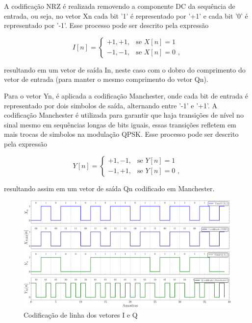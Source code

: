 A codificação \gls{NRZ} é realizada removendo a componente DC da sequência de entrada, ou seja, no vetor \gls{Xn} cada bit '1' é representado por '+1' e cada bit '0' é representado por '-1'. Esse processo pode ser descrito pela expressão

\begin{equation}
I[n] = 
\begin{cases}
+1, +1, & \text{se } X[n] = 1 \\
-1, -1, & \text{se } X[n] = 0 \text{ ,}
\end{cases}
\end{equation}

\noindent resultando em um vetor de saída \gls{In}, neste caso com o dobro do comprimento do vetor de entrada (para manter o mesmo comprimento do vetor \gls{Qn}). 

Para o vetor \gls{Yn}, é aplicada a codificação \gls{Manchester}, onde cada bit de entrada é representado por dois simbolos de saída, alternando entre '-1' e '+1'.  A codificação \gls{Manchester} é utilizada para garantir que haja transições de nível no sinal mesmo em sequências longas de bits iguais, essas transições refletem em mais trocas de simbolos na modulação \gls{QPSK}. Esse processo pode ser descrito pela expressão

\begin{equation}
Y[n] = 
\begin{cases}
+1,-1, & \text{se } Y[n] = 1 \\
-1,+1, & \text{se } Y[n] = 0 \text{ ,}
\end{cases}
\end{equation}

\noindent resultando assim em um vetor de saída \gls{Qn} codificado em Manchester.
\begin{figure}[H]
	\centering
	\caption{Codificação de linha dos vetores I e Q}\label{fig:line_coding}
	\includegraphics[width=\linewidth]{assets/cap2/line_coding.pdf}
\end{figure}


